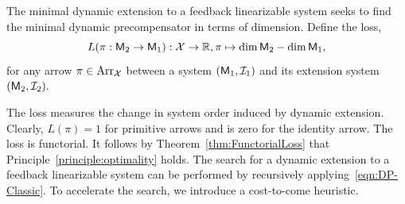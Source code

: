 \documentclass[a4paper]{ifacconf}
\begin{document}
The minimal dynamic extension to a feedback linearizable system seeks to find the minimal dynamic precompensator in terms of dimension.
Define the loss,
\[
  L(\pi: \mathsf{M}_2 \to \mathsf{M}_1)
    : \mathcal{X} \to \mathbb{R},
    \pi \mapsto \operatorname{dim}\mathsf{M}_2 - \operatorname{dim}\mathsf{M}_1,
\]
for any arrow \(\pi \in \mathrm{Arr}_{\mathcal{X}}\) between a system \((\mathsf{M}_1, \mathcal{I}_1)\) and its extension system \((\mathsf{M}_2, \mathcal{I}_2).\)

The loss measures the change in system order induced by dynamic extension.
Clearly, \(L(\pi) = 1\) for primitive arrows and is zero for the identity arrow.
The loss is functorial.
It follows by Theorem~\ref{thm:FunctorialLoss} that Principle~\ref{principle:optimality} holds.
The search for a dynamic extension to a feedback linearizable system can be performed by recursively applying~\eqref{eqn:DP-Classic}.
To accelerate the search, we introduce a cost-to-come heuristic.
\end{document}
